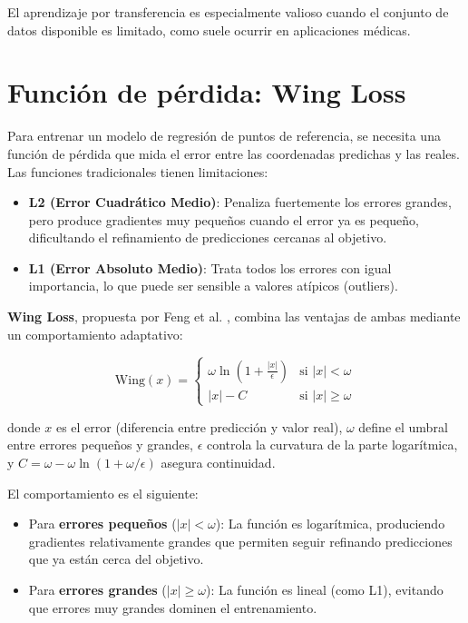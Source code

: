 El aprendizaje por transferencia es especialmente valioso cuando el conjunto de datos disponible es limitado, como suele ocurrir en aplicaciones médicas.

\section{Función de pérdida: Wing Loss}
\label{sec:wing_loss}

Para entrenar un modelo de regresión de puntos de referencia, se necesita una función de pérdida que mida el error entre las coordenadas predichas y las reales. Las funciones tradicionales tienen limitaciones:

\begin{itemize}
    \item \textbf{L2 (Error Cuadrático Medio)}: Penaliza fuertemente los errores grandes, pero produce gradientes muy pequeños cuando el error ya es pequeño, dificultando el refinamiento de predicciones cercanas al objetivo.
    \item \textbf{L1 (Error Absoluto Medio)}: Trata todos los errores con igual importancia, lo que puede ser sensible a valores atípicos (outliers).
\end{itemize}

\textbf{Wing Loss}, propuesta por Feng et al. \cite{feng2018wing}, combina las ventajas de ambas mediante un comportamiento adaptativo:

\begin{equation}
    \text{Wing}(x) =
    \begin{cases}
        \omega \ln\left(1 + \frac{|x|}{\epsilon}\right) & \text{si } |x| < \omega \\
        |x| - C & \text{si } |x| \geq \omega
    \end{cases}
    \label{eq:wing_loss_v2}
\end{equation}

donde $x$ es el error (diferencia entre predicción y valor real), $\omega$ define el umbral entre errores pequeños y grandes, $\epsilon$ controla la curvatura de la parte logarítmica, y $C = \omega - \omega \ln(1 + \omega/\epsilon)$ asegura continuidad.

El comportamiento es el siguiente:
\begin{itemize}
    \item Para \textbf{errores pequeños} ($|x| < \omega$): La función es logarítmica, produciendo gradientes relativamente grandes que permiten seguir refinando predicciones que ya están cerca del objetivo.
    \item Para \textbf{errores grandes} ($|x| \geq \omega$): La función es lineal (como L1), evitando que errores muy grandes dominen el entrenamiento.
\end{itemize}

